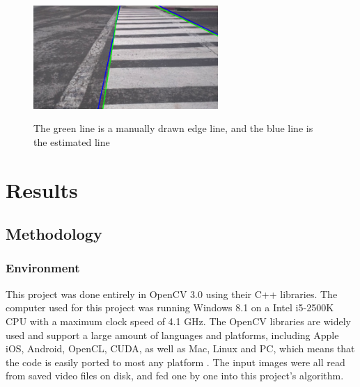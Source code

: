 \documentclass[12pt]{ucthesis}
\newcommand{\captionfonts}{\small\bf\ssp}
\begin{document}
\begin{figure}[h!]
\begin{center}
\includegraphics[width=7cm]{LinesUsingJustGoodStartAndEnds.png}
\captionfonts
\caption[Manually Entered and Estimated Line]{The green line is a manually drawn edge line, and the blue line is the estimated line}
\label{fig:LinesUsingJustGoodStartAndEnds}
\end{center}
\end{figure}


\chapter{Results}
\label{results}

\section{Methodology}

\subsection{Environment}
This project was done entirely in OpenCV 3.0 using their C++ libraries. The computer used for this project was running Windows 8.1 on a Intel i5-2500K CPU with a maximum clock speed of 4.1 GHz. The OpenCV libraries are widely used and support a large amount of languages and platforms, including Apple iOS, Android, OpenCL, CUDA, as well as Mac, Linux and PC, which means that the code is easily ported to most any platform \cite{OpenCVPlatforms}. The input images were all read from saved video files on disk, and fed one by one into this project's algorithm. 

\end{document}
